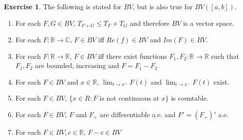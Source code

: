 \documentclass[12pt]{amsart}
\theoremstyle{definition}
\newtheorem{ex}[definition]{Exercise}
\newcommand{\C}{\mathbb{C}}
\newcommand{\R}{\mathbb{R}}
\newcommand{\lex}[1]{\label{ex:#1}}
\begin{document}
	\begin{ex} \lex{00000}  The following is stated for $BV$, but is also true for $BV([a,b])$.
		
		\begin{enumerate} 
			\item For each $F,G \in BV$, $T_{F+G} \leq T_F + T_G$ and therefore $BV$ is a vector space. 
			\item For each $F: \R \rightarrow \C$, $F \in BV$ iff $Re(f) \in BV$ and $Im(F) \in BV$.
			\item For each $F:\R \rightarrow \R$, $F \in BV$ iff there exist functions $F_1,F_2:\R \rightarrow \R$ such that $F_1,F_2$ are bounded, increasing and $F=F_1-F_2$
			\item For each $F \in BV$ and $x \in \R$, $\lim_{t \rightarrow x^+}F(t)$ and $\lim_{t \rightarrow x^-}F(t)$ exist. 
			\item For each $F \in BV$, $\{x \in R: F \text{ is not continuous at }x\}$ is countable.
			\item For each $F \in BV$, $F$ and $F_+$ are differentiable a.e. and $F'=(F_+)'$ a.e.
			\item For each $F \in BV, c \in \R$, $F-c \in BV$
		\end{enumerate}
	\end{ex}
	
\end{document}
